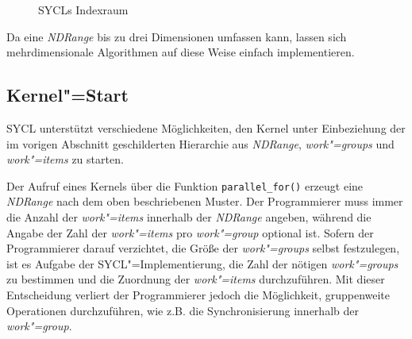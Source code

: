 \begin{figure}
    \caption{SYCLs Indexraum \cite[nach][25]{opencl2012}}
    \label{sycl:konzepte:abstraktion:ndrange}
\end{figure}

Da eine \textit{NDRange} bis zu drei Dimensionen umfassen kann, lassen sich
mehrdimensionale Algorithmen auf diese Weise einfach implementieren.

\subsection{Kernel"=Start}
\label{sycl:konzepte:kernelstart}

SYCL unterstützt verschiedene Möglichkeiten, den Kernel unter Einbeziehung der
im vorigen Abschnitt geschilderten Hierarchie aus \textit{NDRange},
\textit{work"=groups} und \textit{work"=items} zu starten.

Der Aufruf eines Kernels über die Funktion \texttt{parallel\_for()} erzeugt
eine \textit{NDRange} nach dem oben beschriebenen Muster. Der Programmierer muss
immer die Anzahl der \textit{work"=items} innerhalb der \textit{NDRange}
angeben, während die Angabe der Zahl der \textit{work"=items} pro
\textit{work"=group} optional ist. Sofern der Programmierer darauf verzichtet,
die Größe der \textit{work"=groups} selbst festzulegen, ist es Aufgabe der
SYCL"=Implementierung, die Zahl der nötigen \textit{work"=groups} zu bestimmen
und die Zuordnung der \textit{work"=items} durchzuführen. Mit dieser
Entscheidung verliert der Programmierer jedoch die Möglichkeit, gruppenweite
Operationen durchzuführen, wie z.B. die Synchronisierung innerhalb der
\textit{work"=group}.

